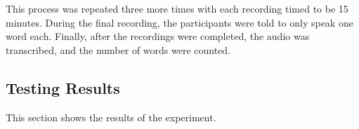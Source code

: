 \documentclass[hidelinks,12pt]{report} %
\begin{document}
This process was repeated three more times with each recording timed to be 15 minutes. During the final recording, the participants were told to only speak one word each. Finally, after the recordings were completed, the audio was transcribed, and the number of words were counted. 

\subsection{Testing Results}

This section shows the results of the experiment.

\begin{table}[h]
\begin{center}
\end{center}
\end{table}
\end{document}
